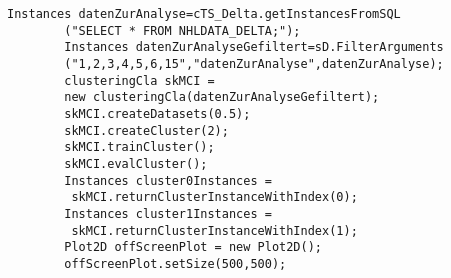 \documentclass{article}
\begin{document}
\lstset{language=Java}          %

\begin{lstlisting}[frame=none]  % Start your code-block
        Instances datenZurAnalyse=cTS_Delta.getInstancesFromSQL
        ("SELECT * FROM NHLDATA_DELTA;");
        Instances datenZurAnalyseGefiltert=sD.FilterArguments
        ("1,2,3,4,5,6,15","datenZurAnalyse",datenZurAnalyse);
        clusteringCla skMCI = 
        new clusteringCla(datenZurAnalyseGefiltert);
        skMCI.createDatasets(0.5);
        skMCI.createCluster(2);
        skMCI.trainCluster();
        skMCI.evalCluster();
        Instances cluster0Instances =
         skMCI.returnClusterInstanceWithIndex(0);
        Instances cluster1Instances =
         skMCI.returnClusterInstanceWithIndex(1);
        Plot2D offScreenPlot = new Plot2D();
        offScreenPlot.setSize(500,500);
\end{lstlisting}
\end{document}
